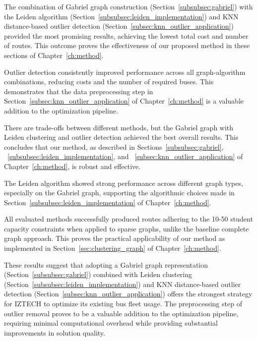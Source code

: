 The combination of Gabriel graph construction (Section~\ref{subsubsec:gabriel}) with the Leiden algorithm (Section~\ref{subsubsec:leiden_implementation}) and KNN distance-based outlier detection (Section~\ref{subsec:knn_outlier_application}) provided the most promising results, achieving the lowest total cost and number of routes. This outcome proves the effectiveness of our proposed method in these sections of Chapter~\ref{ch:method}.

Outlier detection consistently improved performance across all graph-algorithm combinations, reducing costs and the number of required buses. This demonstrates that the data preprocessing step in Section~\ref{subsec:knn_outlier_application} of Chapter~\ref{ch:method} is a valuable addition to the optimization pipeline.

There are trade-offs between different methods, but the Gabriel graph with Leiden clustering and outlier detection achieved the best overall results. This concludes that our method, as described in Sections~\ref{subsubsec:gabriel}, ~\ref{subsubsec:leiden_implementation}, and ~\ref{subsec:knn_outlier_application} of Chapter~\ref{ch:method}, is robust and effective.

The Leiden algorithm showed strong performance across different graph types, especially on the Gabriel graph, supporting the algorithmic choices made in Section~\ref{subsubsec:leiden_implementation} of Chapter~\ref{ch:method}.

All evaluated methods successfully produced routes adhering to the 10-50 student capacity constraints when applied to sparse graphs, unlike the baseline complete graph approach. This proves the practical applicability of our method as implemented in Section~\ref{sec:clustering_graph} of Chapter~\ref{ch:method}.

These results suggest that adopting a Gabriel graph representation (Section~\ref{subsubsec:gabriel}) combined with Leiden clustering (Section~\ref{subsubsec:leiden_implementation}) and KNN distance-based outlier detection (Section~\ref{subsec:knn_outlier_application}) offers the strongest strategy for IZTECH to optimize its existing bus fleet usage. The preprocessing step of outlier removal proves to be a valuable addition to the optimization pipeline, requiring minimal computational overhead while providing substantial improvements in solution quality.



